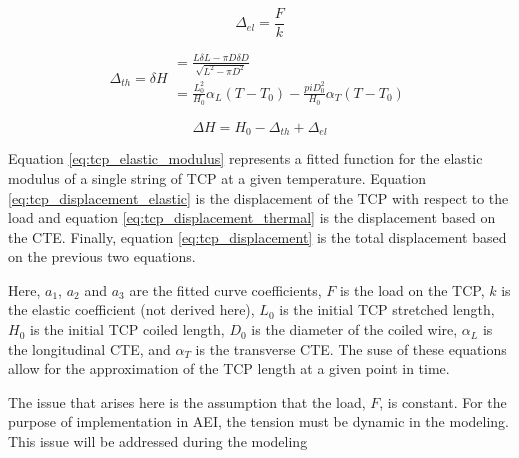 	\begin{equation}
	\label{eq:tcp_displacement_elastic}
		\Delta_{el} = \frac{F}{k}
	\end{equation}
	
	\begin{equation}
	\label{eq:tcp_displacement_thermal}
		\Delta_{th} = \delta H
		\begin{matrix}			
			= \frac{L \delta L - \pi D \delta D}{\sqrt{L^{2} - \pi D^{2}}} \\
			= \frac{L^{2}_{0}}{H_{0}} \alpha_{L} (T - T_{0}) - \frac{pi D^{2}_{0}}{H_{0}} \alpha_{T} (T - T_{0})
		\end{matrix}
	\end{equation}
	
	\begin{equation}
	\label{eq:tcp_displacement}
		\Delta H = H_{0} - \Delta_{th} + \Delta_{el}
	\end{equation}
	
	Equation \ref{eq:tcp_elastic_modulus} represents a fitted function for the elastic modulus of a single string of TCP at a given temperature. Equation \ref{eq:tcp_displacement_elastic} is the displacement of the TCP with respect to the load and equation \ref{eq:tcp_displacement_thermal} is the displacement based on the CTE. Finally, equation \ref{eq:tcp_displacement} is the total displacement based on the previous two equations.
	
	Here, $a_{1}$, $a_{2}$ and $a_{3}$ are the fitted curve coefficients, $F$ is the load on the TCP, $k$ is the elastic coefficient (not derived here), $L_{0}$ is the initial TCP stretched length, $H_{0}$ is the initial TCP coiled length, $D_{0}$ is the diameter of the coiled wire, $\alpha_{L}$ is the longitudinal CTE, and $\alpha_{T}$ is the transverse CTE. The suse of these equations allow for the approximation of the TCP length at a given point in time.
	
	The issue that arises here is the assumption that the load, $F$, is constant. For the purpose of implementation in AEI, the tension must be dynamic in the modeling. This issue will be addressed during the modeling 